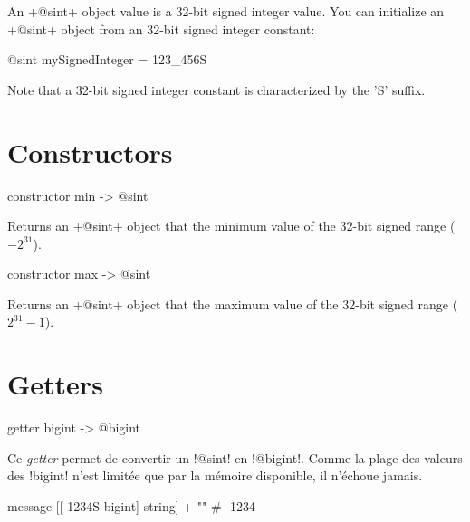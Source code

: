 

An \ggs+@sint+ object value is a 32-bit signed integer value. You can initialize an \ggs+@sint+ object from an 32-bit signed integer constant:\\

\begin{galgas}
@sint mySignedInteger = 123_456S
\end{galgas}


Note that a 32-bit signed integer constant is characterized by the 'S' suffix.


\section{Constructors}


\begin{galgas}
constructor min -> @sint
\end{galgas}

Returns an \ggs+@sint+ object that the minimum value of the 32-bit signed range ($-2^{31}$).






\begin{galgas}
constructor max -> @sint
\end{galgas}


Returns an \ggs+@sint+ object that the maximum value of the 32-bit signed range ($2^{31}-1$).



\section{Getters}


\begin{galgasbox}
getter bigint -> @bigint
\end{galgasbox}

Ce \emph{getter} permet de convertir un \ggs!@sint! en \ggs!@bigint!. Comme la plage des valeurs des \ggs!bigint! n'est limitée que par la mémoire disponible, il n'échoue jamais.

\begin{galgas}
  message [[-1234S bigint] string] + "\n" # -1234
\end{galgas}


